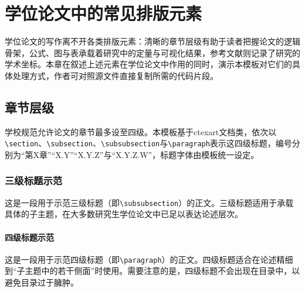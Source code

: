 \clearpage

\section{学位论文中的常见排版元素}

学位论文的写作离不开各类排版元素：清晰的章节层级有助于读者把握论文的逻辑骨架，公式、图与表承载着研究中的定量与可视化结果，参考文献则记录了研究的学术坐标。本章在叙述上述元素在学位论文中作用的同时，演示本模板对它们的具体处理方式，作者可对照源文件直接复制所需的代码片段。

\subsection{章节层级}

学校规范允许论文的章节最多设至四级。本模板基于ctexart文档类，依次以\verb|\section|、\verb|\subsection|、\verb|\subsubsection|与\verb|\paragraph|表示这四级标题，编号分别为“第X章”“X.Y”“X.Y.Z”与“X.Y.Z.W”，标题字体由模板统一设定。

\subsubsection{三级标题示范}

这是一段用于示范三级标题（即\verb|\subsubsection|）的正文。三级标题适用于承载具体的子主题，在大多数研究生学位论文中已足以表达论述层次。

\paragraph{四级标题示范}

这是一段用于示范四级标题（即\verb|\paragraph|）的正文。四级标题适合在论述精细到“子主题中的若干侧面”时使用。需要注意的是，四级标题不会出现在目录中，以避免目录过于臃肿。

